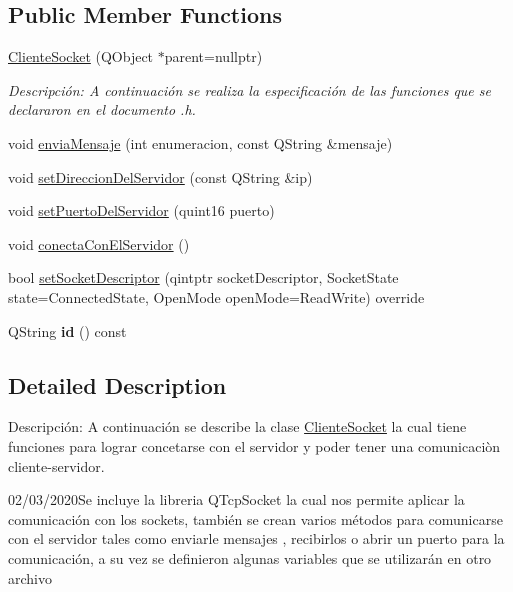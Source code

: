 \subsection*{Public Member Functions}
\begin{DoxyCompactItemize}
\item 
\hyperlink{class_cliente_socket_a92a124ca5c40e83cf640bd3c845af6ca}{Cliente\+Socket} (Q\+Object $\ast$parent=nullptr)
\begin{DoxyCompactList}\small\item\em Descripción\+: A continuación se realiza la especificación de las funciones que se declararon en el documento .h. \end{DoxyCompactList}\item 
void \hyperlink{class_cliente_socket_ad176a3962afc92f60da91d2526bcf569}{envia\+Mensaje} (int enumeracion, const Q\+String \&mensaje)
\item 
void \hyperlink{class_cliente_socket_a2ed30e026ad1252c8ad07fd437cf4cc4}{set\+Direccion\+Del\+Servidor} (const Q\+String \&ip)
\item 
void \hyperlink{class_cliente_socket_ad5b33460d9575854b5617d2a6e467231}{set\+Puerto\+Del\+Servidor} (quint16 puerto)
\item 
void \hyperlink{class_cliente_socket_a8cb382178c3e572188c61af72355f174}{conecta\+Con\+El\+Servidor} ()
\item 
bool \hyperlink{class_cliente_socket_af8e9fa96a8f3a2207f34b26c74d53de9}{set\+Socket\+Descriptor} (qintptr socket\+Descriptor, Socket\+State state=Connected\+State, Open\+Mode open\+Mode=Read\+Write) override
\item 
\mbox{\label{class_cliente_socket_aa40872ba7f52bc1047e2012a6f824bcb}} 
Q\+String {\bfseries id} () const
\end{DoxyCompactItemize}


\subsection{Detailed Description}
Descripción\+: A continuación se describe la clase \hyperlink{class_cliente_socket}{Cliente\+Socket} la cual tiene funciones para lograr concetarse con el servidor y poder tener una comunicaciòn cliente-\/servidor. 

02/03/2020\+Se incluye la libreria Q\+Tcp\+Socket la cual nos permite aplicar la comunicación con los sockets, también se crean varios métodos para comunicarse con el servidor tales como enviarle mensajes , recibirlos o abrir un puerto para la comunicación, a su vez se definieron algunas variables que se utilizarán en otro archivo 

